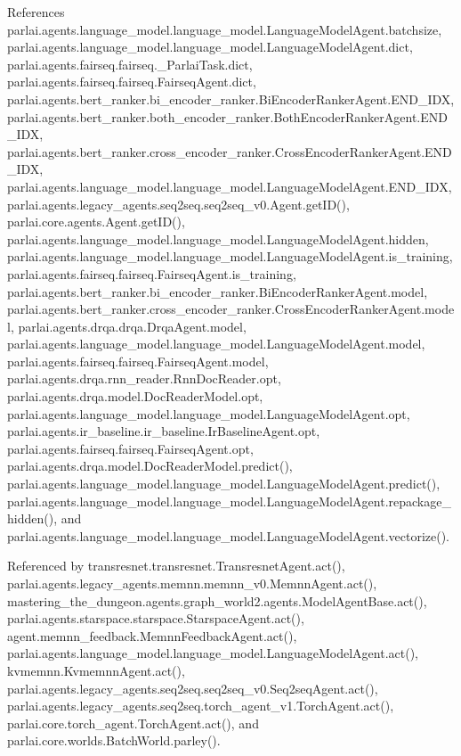 References parlai.\+agents.\+language\+\_\+model.\+language\+\_\+model.\+Language\+Model\+Agent.\+batchsize, parlai.\+agents.\+language\+\_\+model.\+language\+\_\+model.\+Language\+Model\+Agent.\+dict, parlai.\+agents.\+fairseq.\+fairseq.\+\_\+\+Parlai\+Task.\+dict, parlai.\+agents.\+fairseq.\+fairseq.\+Fairseq\+Agent.\+dict, parlai.\+agents.\+bert\+\_\+ranker.\+bi\+\_\+encoder\+\_\+ranker.\+Bi\+Encoder\+Ranker\+Agent.\+E\+N\+D\+\_\+\+I\+DX, parlai.\+agents.\+bert\+\_\+ranker.\+both\+\_\+encoder\+\_\+ranker.\+Both\+Encoder\+Ranker\+Agent.\+E\+N\+D\+\_\+\+I\+DX, parlai.\+agents.\+bert\+\_\+ranker.\+cross\+\_\+encoder\+\_\+ranker.\+Cross\+Encoder\+Ranker\+Agent.\+E\+N\+D\+\_\+\+I\+DX, parlai.\+agents.\+language\+\_\+model.\+language\+\_\+model.\+Language\+Model\+Agent.\+E\+N\+D\+\_\+\+I\+DX, parlai.\+agents.\+legacy\+\_\+agents.\+seq2seq.\+seq2seq\+\_\+v0.\+Agent.\+get\+I\+D(), parlai.\+core.\+agents.\+Agent.\+get\+I\+D(), parlai.\+agents.\+language\+\_\+model.\+language\+\_\+model.\+Language\+Model\+Agent.\+hidden, parlai.\+agents.\+language\+\_\+model.\+language\+\_\+model.\+Language\+Model\+Agent.\+is\+\_\+training, parlai.\+agents.\+fairseq.\+fairseq.\+Fairseq\+Agent.\+is\+\_\+training, parlai.\+agents.\+bert\+\_\+ranker.\+bi\+\_\+encoder\+\_\+ranker.\+Bi\+Encoder\+Ranker\+Agent.\+model, parlai.\+agents.\+bert\+\_\+ranker.\+cross\+\_\+encoder\+\_\+ranker.\+Cross\+Encoder\+Ranker\+Agent.\+model, parlai.\+agents.\+drqa.\+drqa.\+Drqa\+Agent.\+model, parlai.\+agents.\+language\+\_\+model.\+language\+\_\+model.\+Language\+Model\+Agent.\+model, parlai.\+agents.\+fairseq.\+fairseq.\+Fairseq\+Agent.\+model, parlai.\+agents.\+drqa.\+rnn\+\_\+reader.\+Rnn\+Doc\+Reader.\+opt, parlai.\+agents.\+drqa.\+model.\+Doc\+Reader\+Model.\+opt, parlai.\+agents.\+language\+\_\+model.\+language\+\_\+model.\+Language\+Model\+Agent.\+opt, parlai.\+agents.\+ir\+\_\+baseline.\+ir\+\_\+baseline.\+Ir\+Baseline\+Agent.\+opt, parlai.\+agents.\+fairseq.\+fairseq.\+Fairseq\+Agent.\+opt, parlai.\+agents.\+drqa.\+model.\+Doc\+Reader\+Model.\+predict(), parlai.\+agents.\+language\+\_\+model.\+language\+\_\+model.\+Language\+Model\+Agent.\+predict(), parlai.\+agents.\+language\+\_\+model.\+language\+\_\+model.\+Language\+Model\+Agent.\+repackage\+\_\+hidden(), and parlai.\+agents.\+language\+\_\+model.\+language\+\_\+model.\+Language\+Model\+Agent.\+vectorize().



Referenced by transresnet.\+transresnet.\+Transresnet\+Agent.\+act(), parlai.\+agents.\+legacy\+\_\+agents.\+memnn.\+memnn\+\_\+v0.\+Memnn\+Agent.\+act(), mastering\+\_\+the\+\_\+dungeon.\+agents.\+graph\+\_\+world2.\+agents.\+Model\+Agent\+Base.\+act(), parlai.\+agents.\+starspace.\+starspace.\+Starspace\+Agent.\+act(), agent.\+memnn\+\_\+feedback.\+Memnn\+Feedback\+Agent.\+act(), parlai.\+agents.\+language\+\_\+model.\+language\+\_\+model.\+Language\+Model\+Agent.\+act(), kvmemnn.\+Kvmemnn\+Agent.\+act(), parlai.\+agents.\+legacy\+\_\+agents.\+seq2seq.\+seq2seq\+\_\+v0.\+Seq2seq\+Agent.\+act(), parlai.\+agents.\+legacy\+\_\+agents.\+seq2seq.\+torch\+\_\+agent\+\_\+v1.\+Torch\+Agent.\+act(), parlai.\+core.\+torch\+\_\+agent.\+Torch\+Agent.\+act(), and parlai.\+core.\+worlds.\+Batch\+World.\+parley().

